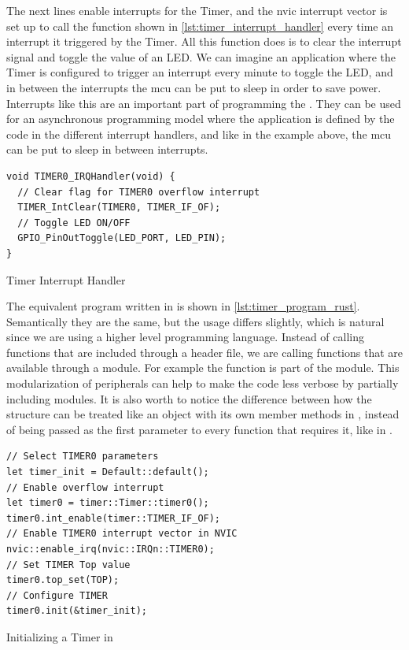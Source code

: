The next lines enable interrupts for the Timer, and the \gls{nvic} interrupt vector is set up to call the function shown in \autoref{lst:timer_interrupt_handler} every time an interrupt it triggered by the Timer.
All this function does is to clear the interrupt signal and toggle the value of an LED.
We can imagine an application where the Timer is configured to trigger an interrupt every minute to toggle the LED, and in between the interrupts the \gls{mcu} can be put to sleep in order to save power.
Interrupts like this are an important part of programming the {\gecko}.
They can be used for an asynchronous programming model where the application is defined by the code in the different interrupt handlers, and like in the example above, the \gls{mcu} can be put to sleep in between interrupts.

\begin{listing}[h]
\begin{verbatim}
void TIMER0_IRQHandler(void) {
  // Clear flag for TIMER0 overflow interrupt
  TIMER_IntClear(TIMER0, TIMER_IF_OF);
  // Toggle LED ON/OFF
  GPIO_PinOutToggle(LED_PORT, LED_PIN);
}
\end{verbatim}
\caption{Timer Interrupt Handler}
\label{lst:timer_interrupt_handler}
\end{listing}

The equivalent program written in {\rust} is shown in \autoref{lst:timer_program_rust}.
Semantically they are the same, but the usage differs slightly, which is natural since we are using a higher level programming language.
Instead of calling functions that are included through a {\C} header file, we are calling functions that are available through a {\rust} module.
For example the  function is part of the  module.
This modularization of peripherals can help to make the code less verbose by partially including modules.
It is also worth to notice the difference between how the  structure can be treated like an object with its own member methods in {\rust}, instead of being passed as the first parameter to every function that requires it, like in {\C}.

\begin{listing}[h]
\begin{verbatim}
// Select TIMER0 parameters
let timer_init = Default::default();
// Enable overflow interrupt
let timer0 = timer::Timer::timer0();
timer0.int_enable(timer::TIMER_IF_OF);
// Enable TIMER0 interrupt vector in NVIC
nvic::enable_irq(nvic::IRQn::TIMER0);
// Set TIMER Top value
timer0.top_set(TOP);
// Configure TIMER
timer0.init(&timer_init);
\end{verbatim}
\caption{Initializing a Timer in {\rust}}
\label{lst:timer_program_rust}
\end{listing}

